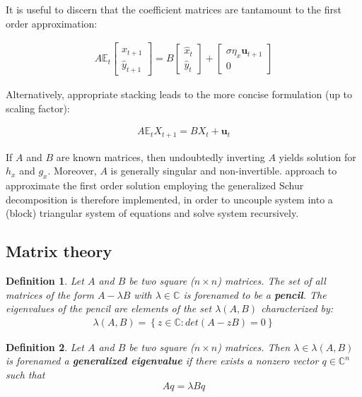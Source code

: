\documentclass{pracamgr}
\numberwithin{equation}{section}
\newtheorem{mydef}{Definition}
\begin{document}
It is useful to discern that the coefficient matrices are tantamount to the first order approximation:

\begin{eqnarray}
A \mathbb{E}_t\begin{bmatrix} \widehat{x}_{t+1} \\ \widehat{y}_{t+1} \end{bmatrix} = B\begin{bmatrix} \widehat{x}_t\\ \widehat{y}_t \end{bmatrix} + \begin{bmatrix} \sigma \eta_x \mathbf{u}_{t+1} \\ 0\end{bmatrix}
\end{eqnarray}

Alternatively, appropriate stacking leads to the more concise formulation (up to scaling factor):

\begin{align}
A \mathbb{E}_{t}X_{t+1} = BX_{t} + \mathbf{u}_{t}
\end{align}

If $A$ and $B$ are known matrices, then undoubtedly inverting $A$ yields solution for $h_x$ and $g_x$. Moreover, $A$ is generally singular and non-invertible. \cite{klein2000using} approach to approximate the first order solution employing the generalized Schur decomposition is therefore implemented, in order to uncouple system into a (block) triangular system of equations and solve system recursively.
 
\subsection{Matrix theory}

\begin{mydef}
Let $A$ and $B$ be two square ($n\times n$) matrices. The set of all matrices of the form $A-\lambda B$ with $\lambda \in \mathbb{C}$ is forenamed to be a \textbf{pencil}. The eigenvalues of the pencil are elements of the set $\lambda(A,B)$ characterized by:
  \begin{align*}
    \lambda(A,B) =  \left\{z \in \mathbb{C}:det(A-zB)=0\right\}
  \end{align*}
\end{mydef}

\begin{mydef}
Let $A$ and $B$ be two square ($n\times n$) matrices. Then $\lambda \in \lambda(A,B)$ is forenamed a \textbf{generalized eigenvalue} if there exists a nonzero vector $q\in \mathbb{C}^n$ such that $$A q = \lambda B q$$
\end{mydef}
\end{document}
